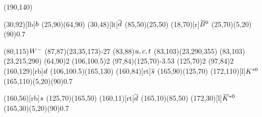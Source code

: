\documentclass{standalone}
\begin{document}
\begin{axopicture}(190,140)

  \Text(30,92)[lb]{${b}$}                     %
  \Line[arrow](25,90)(64,90)                      %
  \Text(30,48)[lt]{${\overline {{d}}}$}                  %
  \Line[arrow](85,50)(25,50)                      %
  \Text(18,70)[r]{${{\kern 0.18em\overline{\kern -0.18em B}}{}^0}$}                         %
  \GOval(25,70)(5,20)(90){0.7}                    %
                                                  
  \Text(80,115){\small{${W^-}$}}                    %
  \PhotonArc(87,87)(23,35,173){-2}{7}             %
  \Text(83,88){${u}, {c}, {t}$}       %
  \Arc[arrow,arrowpos=0.60](83,103)(23,290,355)   %
  \Arc[arrow,arrowpos=0.60](83,103)(23,215,290)   %
  \Vertex(64,90){2}                               %
  \Vertex(106,100.5){2}                           %
  \Gluon(97,84)(125,70){-3.5}{3}                  %
  \Vertex(125,70){2}                              %
  \Vertex(97,84){2}                               %
  \Text(160,129)[rb]{${d}$}                   %
  \Line[arrow](106,100.5)(165,130)                %
  \Text(160,84)[rt]{${\overline {{s}}}$}                 %
  \Line[arrow](165,90)(125,70)                    %
  \Text(172,110)[l]{${{K}^{*0}}$}                    %
  \GOval(165,110)(5,20)(90){0.7}                  %
                                                  
  \Text(160,56)[rb]{${s}$}                    %
  \Line[arrow](125,70)(165,50)                    %
  \Text(160,11)[rt]{${\overline {{d}}}$}                 %
  \Line[arrow](165,10)(85,50)                     %
  \Text(172,30)[l]{${{\kern 0.18em\overline{\kern -0.18em K}}{}^{*0}}$}                    %
  \GOval(165,30)(5,20)(90){0.7}                   %
                                                  
\end{axopicture}
\end{document}
